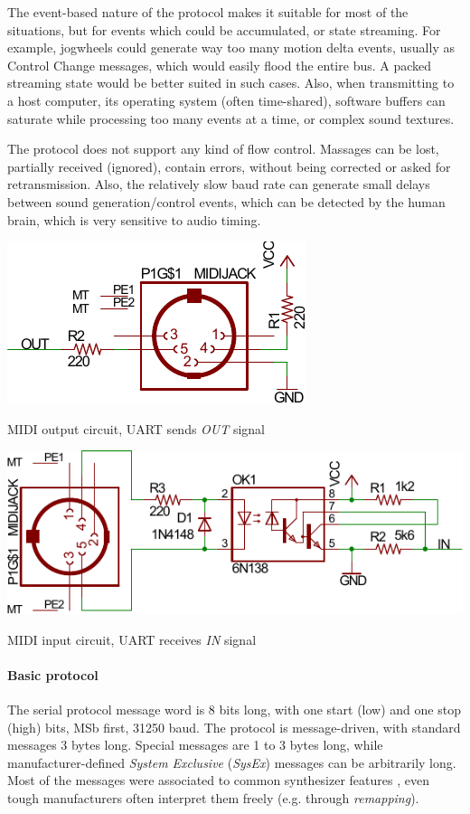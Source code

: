 \documentclass[a4paper,10pt]{article}
\makeatletter
\newenvironment{figurehere}{\def\@captype{figure}\vspace{2ex}}{\vspace{2ex}}
\makeatother
\begin{document}
\begin{multicols}{2}
The event-based nature of the protocol makes it suitable for most of the
situations, but for events which could be accumulated, or state streaming.
For example, jogwheels could generate way too many motion delta events, usually
as Control Change messages, which would easily flood the entire bus. A packed
streaming state would be better suited in such cases.
Also, when transmitting to a host computer, its operating system (often
time-shared), software buffers can saturate while processing too many events
at a time, or complex sound textures.

The protocol does not support any kind of flow control. Massages can be lost,
partially received (ignored), contain errors, without being corrected or asked
for retransmission. Also, the relatively slow baud rate can generate small
delays between sound generation/control events, which can be detected by
the human brain, which is very sensitive to audio timing.

\begin{figurehere}
	\centering
	\includegraphics[keepaspectratio=true,width=0.6\columnwidth]{images/midi_out.pdf}
	\caption{MIDI output circuit, UART sends \emph{OUT} signal}
	\label{fig:midi_out}
\end{figurehere}

\begin{figurehere}
	\centering
	\includegraphics[keepaspectratio=true,width=\columnwidth]{images/midi_in.pdf}
	\caption{MIDI input circuit, UART receives \emph{IN} signal}
	\label{fig:midi_in}
\end{figurehere}


\paragraph{Basic protocol}
The serial protocol message word is 8 bits long, with one start (low) and one
stop (high) bits, MSb first, 31250 baud. The protocol is message-driven, with
standard messages 3 bytes long. Special messages are 1 to 3 bytes long, while
manufacturer-defined \emph{System Exclusive} (\emph{SysEx}) messages can be
arbitrarily long. Most of the messages were associated to common synthesizer
features \cite{midi_messages}, even tough manufacturers often interpret them
freely (e.g. through \emph{remapping}).


\end{multicols}
\end{document}
